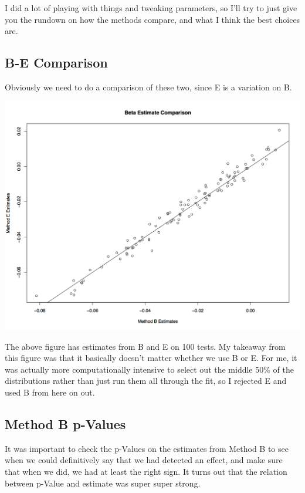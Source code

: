 \documentclass[11pt]{article} %
\begin{document}
\section{}
I did a lot of playing with things and tweaking parameters, so I'll try to just give you the rundown on how the methods compare, and what I think the best choices are.

\subsection{B-E Comparison}
Obviously we need to do a comparison of these two, since E is a variation on B.

\includegraphics[scale=0.5]{BE Comparison.png}

The above figure has estimates from B and E on 100 tests. My takeaway from this figure was that it basically doesn't matter whether we use B or E. For me, it was actually more computationally intensive to select out the middle 50\% of the distributions rather than just run them all through the fit, so I rejected E and used B from here on out.

\subsection{Method B p-Values}

It was important to check the p-Values on the estimates from Method B to see when we could definitively say that we had detected an effect, and make sure that when we did, we had at least the right sign. It turns out that the relation between p-Value and estimate was super super strong.
\end{document}
